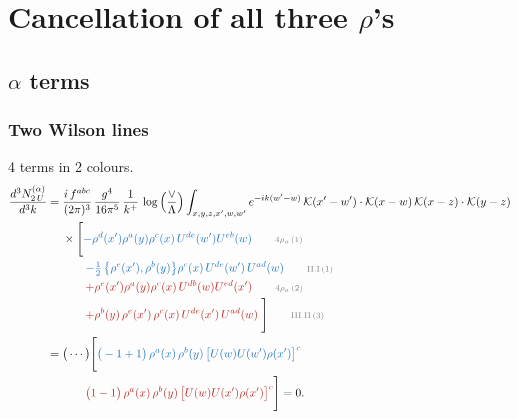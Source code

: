 \documentclass[10pt]{article}
\begin{document}
\section{Cancellation of all three $\rho$'s}
\subsection{$\alpha$ terms}
\subsubsection{Two Wilson lines}
4 terms in 2 colours.
\begin{align}
\frac{d^{3}N^{(\alpha)}_{2\,U}}{d^{3}k}={}&\frac{i\,f^{abc}}{(2\pi)^{3}}\,\frac{g^{4}}{16\pi^{5}}\,\frac{1}{k^{+}}\,\log\Big(\frac{\vee}{\Lambda}\Big)\int_{x,y,z,x',w,w'}e^{-ik(w'-w)}\,\mathcal{K}(x'-w')\cdot\mathcal{K}(x-w)\,\mathcal{K}(x-z)\cdot\mathcal{K}(y-z)\notag\\
&\times\Bigg[{\color{RoyalBlue}-\rho^{d}(x') \rho^{a}(y) \rho^{c}(x)\,U^{d e}(w') U^{e b}(w)}\tag*{\color{gray}\scriptsize $4\rho_a$\,(1)}\\
&\qquad{\color{RoyalBlue}-\tfrac{1}{2}\,\big\{\rho^{e}(x'),\rho^{b}(y)\big\}\rho^{c}(x)\,U^{de}(w')\,U^{ad}(w)}\tag*{\color{gray}\scriptsize II.I\,(1)}\\
&\qquad{\color{BrickRed}+\rho^{e}(x') \rho^{a}(y) \rho^{c}(x)\, U^{d b}(w) U^{e d}(x')}\tag*{\color{gray}\scriptsize $4\rho_a$\,(2)}\\
&\qquad{\color{BrickRed}+\rho^{b}(y)\,\rho^{e}(x')\,\rho^{c}(x)\,U^{de}(x')\,U^{ad}(w)}\;\Bigg]\tag*{\color{gray}\scriptsize III.II\,(3)}\\
={}&\big(\cdots\big)\Bigg[{\color{RoyalBlue}\big(-1+1\big)\,\rho^{a}(x)\,\rho^{b}(y)\,\big[U(w)U(w')\rho(x')\big]^{c}}\notag\\
&\qquad{\color{BrickRed}\big(1-1\big)\,\rho^{a}(x)\,\rho^{b}(y)\,\big[U(w)U(x')\rho(x')\big]^{c}}\Bigg]=0.
\end{align}
\end{document}
